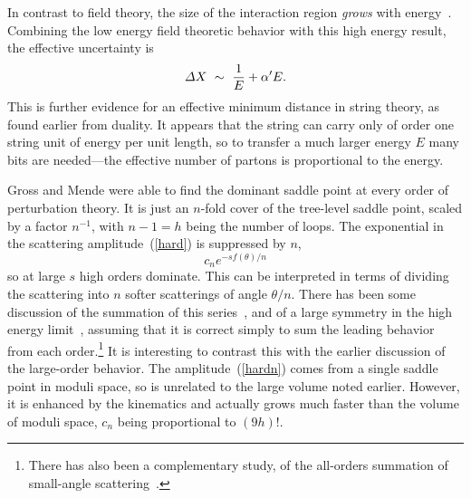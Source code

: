 In contrast
to field theory, the size of the interaction region {\it grows} with
energy~\cite{GM}. Combining the low energy field theoretic behavior
with this high energy result, the effective uncertainty is
\begin{equation}
{\mit \Delta} X \ \sim\ \frac{1}{E} + \alpha' E. \label{strun}
\end{equation}
This is further evidence for an effective minimum distance in string
theory, as found earlier from duality.  It appears that the string
can carry only of order one string unit of energy per unit length, so
to transfer a much larger energy $E$ many bits are needed---the
effective number of partons is proportional to the energy.

Gross and Mende were able to find the dominant saddle point at every
order of perturbation theory.  It is just an
$n$-fold cover of the tree-level saddle point, scaled by a factor
$n^{-1}$, with $n-1=h$ being the number of loops.  The exponential in
the scattering amplitude~(\ref{hard}) is suppressed by $n$,
\begin{equation}
c_n e^{- s f(\theta) / n} \label{hardn}
\end{equation}
so at large $s$ high orders dominate.
This can be interpreted in terms of dividing the scattering into $n$
softer scatterings of angle $\theta/n$. 
There has been some discussion of the summation of this
series~\cite{MOog}, and of a large symmetry in the high energy
limit~\cite{Ghesym}, assuming that it is correct simply to sum the
leading behavior from each order.\footnote{There has also been a
complementary study, of the all-orders summation of small-angle
scattering~\cite{ACV}.} It is interesting to contrast this with the
earlier discussion of the large-order behavior.  The
amplitude~(\ref{hardn}) comes from a single saddle point in moduli
space, so is unrelated to the large volume noted earlier.  However,
it is enhanced by the kinematics and actually grows much faster than
the volume of moduli space, $c_n$ being proportional to $(9h)!$.  

